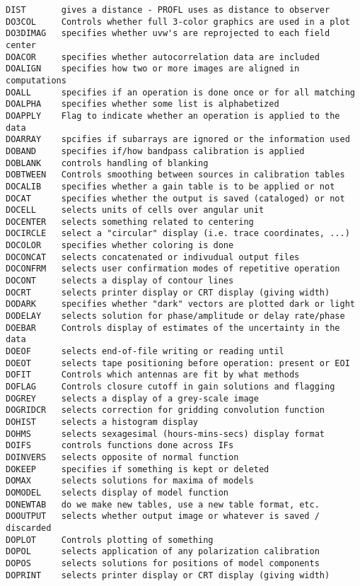 \begin{verbatim}
DIST       gives a distance - PROFL uses as distance to observer
DO3COL     Controls whether full 3-color graphics are used in a plot
DO3DIMAG   specifies whether uvw's are reprojected to each field center
DOACOR     specifies whether autocorrelation data are included
DOALIGN    specifies how two or more images are aligned in computations
DOALL      specifies if an operation is done once or for all matching
DOALPHA    specifies whether some list is alphabetized
DOAPPLY    Flag to indicate whether an operation is applied to the data
DOARRAY    spcifies if subarrays are ignored or the information used
DOBAND     specifies if/how bandpass calibration is applied
DOBLANK    controls handling of blanking
DOBTWEEN   Controls smoothing between sources in calibration tables
DOCALIB    specifies whether a gain table is to be applied or not
DOCAT      specifies whether the output is saved (cataloged) or not
DOCELL     selects units of cells over angular unit
DOCENTER   selects something related to centering
DOCIRCLE   select a "circular" display (i.e. trace coordinates, ...)
DOCOLOR    specifies whether coloring is done
DOCONCAT   selects concatenated or indivudual output files
DOCONFRM   selects user confirmation modes of repetitive operation
DOCONT     selects a display of contour lines
DOCRT      selects printer display or CRT display (giving width)
DODARK     specifies whether "dark" vectors are plotted dark or light
DODELAY    selects solution for phase/amplitude or delay rate/phase
DOEBAR     Controls display of estimates of the uncertainty in the data
DOEOF      selects end-of-file writing or reading until
DOEOT      selects tape positioning before operation: present or EOI
DOFIT      Controls which antennas are fit by what methods
DOFLAG     Controls closure cutoff in gain solutions and flagging
DOGREY     selects a display of a grey-scale image
DOGRIDCR   selects correction for gridding convolution function
DOHIST     selects a histogram display
DOHMS      selects sexagesimal (hours-mins-secs) display format
DOIFS      controls functions done across IFs
DOINVERS   selects opposite of normal function
DOKEEP     specifies if something is kept or deleted
DOMAX      selects solutions for maxima of models
DOMODEL    selects display of model function
DONEWTAB   do we make new tables, use a new table format, etc.
DOOUTPUT   selects whether output image or whatever is saved / discarded
DOPLOT     Controls plotting of something
DOPOL      selects application of any polarization calibration
DOPOS      selects solutions for positions of model components
DOPRINT    selects printer display or CRT display (giving width)

\end{verbatim}
